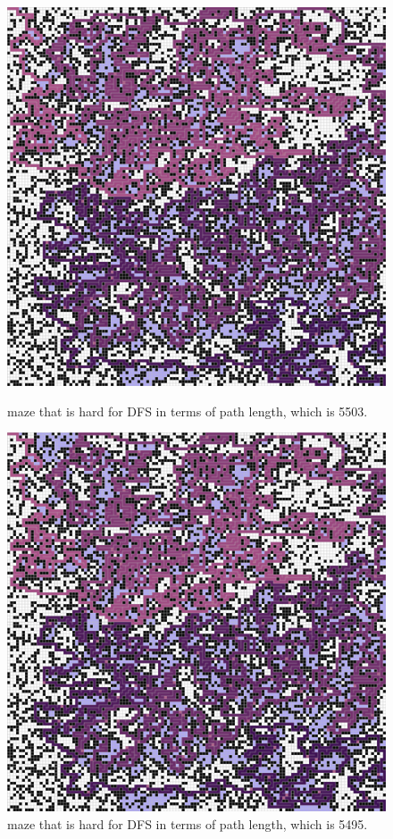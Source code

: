 \documentclass[letter]{article}
\begin{document}
\begin{enumerate}[resume]
\begin{enumerate}
\begin{enumerate}
\begin{figure}
					\includegraphics[width=\textwidth]{../pics/dp/5503.png}
					\caption{\label{fig:dp2}maze that is hard for DFS in terms of path length, which is 5503.}
					\endminipage\hfill
					\includegraphics[width=\textwidth]{../pics/dp/5495.png}
					\caption{\label{fig:dp3}maze that is hard for DFS in terms of path length, which is 5495.}
					\endminipage
					\endminipage
					

\end{figure}
\end{enumerate}
\end{enumerate}
\end{enumerate}
\end{document}
